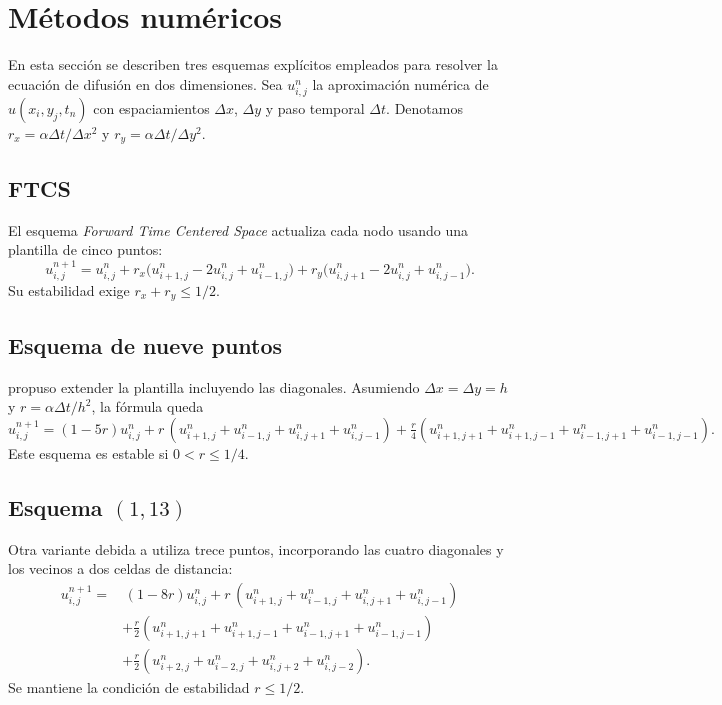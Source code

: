 \section{M\'etodos num\'ericos}
En esta secci\'on se describen tres esquemas expl\'icitos empleados para resolver la ecuaci\'on de difusi\'on en dos dimensiones. Sea $u_{i,j}^n$ la aproximaci\'on num\'erica de $u(x_i,y_j,t_n)$ con espaciamientos $\Delta x$, $\Delta y$ y paso temporal $\Delta t$. Denotamos $r_x=\alpha \Delta t/\Delta x^2$ y $r_y=\alpha \Delta t/\Delta y^2$.

\subsection{FTCS}
El esquema \emph{Forward Time Centered Space} actualiza cada nodo usando una plantilla de cinco puntos:
\begin{equation}
  u_{i,j}^{n+1} = u_{i,j}^n + r_x\bigl(u_{i+1,j}^n - 2 u_{i,j}^n + u_{i-1,j}^n\bigr)
  + r_y\bigl(u_{i,j+1}^n - 2 u_{i,j}^n + u_{i,j-1}^n\bigr).
\end{equation}
Su estabilidad exige $r_x + r_y \le 1/2$.

\subsection{Esquema de nueve puntos}
\citet{dehghan2002} propuso extender la plantilla incluyendo las diagonales. Asumiendo $\Delta x = \Delta y = h$ y $r = \alpha \Delta t / h^2$, la f\'ormula queda
\begin{equation}
  u_{i,j}^{n+1} = (1-5 r) u_{i,j}^n + r\,(u_{i+1,j}^n + u_{i-1,j}^n + u_{i,j+1}^n + u_{i,j-1}^n)
  + \tfrac{r}{4} (u_{i+1,j+1}^n + u_{i+1,j-1}^n + u_{i-1,j+1}^n + u_{i-1,j-1}^n).
\end{equation}
Este esquema es estable si $0 < r \le 1/4$.

\subsection{Esquema $(1,13)$}
Otra variante debida a \citet{dehghan2002} utiliza trece puntos, incorporando las cuatro diagonales y los vecinos a dos celdas de distancia:
\begin{equation}
\begin{split}
  u_{i,j}^{n+1} = &\,(1-8 r) u_{i,j}^n + r\,(u_{i+1,j}^n+u_{i-1,j}^n+u_{i,j+1}^n+u_{i,j-1}^n) \\&
  + \tfrac{r}{2}(u_{i+1,j+1}^n+u_{i+1,j-1}^n+u_{i-1,j+1}^n+u_{i-1,j-1}^n)\\&
  + \tfrac{r}{2}(u_{i+2,j}^n+u_{i-2,j}^n+u_{i,j+2}^n+u_{i,j-2}^n).
\end{split}
\end{equation}
Se mantiene la condici\'on de estabilidad $r \le 1/2$.
